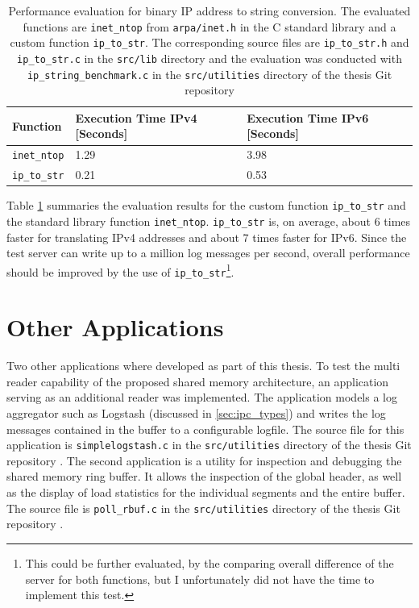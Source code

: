 \begin{table}[h!]
    \centering
    \small
    \begin{tabular}{lll}
        \toprule
        \textbf{Function} & \textbf{Execution Time IPv4 [Seconds]} & \textbf{Execution Time IPv6 [Seconds]} \\ \midrule 
        \texttt{inet\_ntop} & 1.29 & 3.98 \\ \midrule
        \texttt{ip\_to\_str} & 0.21 & 0.53 \\ 
        \bottomrule
    \end{tabular}
    \caption[IP String Conversion]{Performance evaluation for binary IP address to string conversion. The evaluated functions are
    \texttt{inet\_ntop} from \texttt{arpa/inet.h} in the C standard library and a custom function \texttt{ip\_to\_str}. The corresponding source 
    files are \texttt{ip\_to\_str.h}
    and \texttt{ip\_to\_str.c} in the \texttt{src/lib} directory and the evaluation was conducted with
    \texttt{ip\_string\_benchmark.c} in the \texttt{src/utilities} directory of the thesis Git repository \cite{gitlab}}
    \label{tab:ip_str}
\end{table}

Table \ref{tab:ip_str} summaries the evaluation results for the custom function \texttt{ip\_to\_str} and the standard library function \texttt{inet\_ntop}. 
\texttt{ip\_to\_str} is, on average, about 6 times faster for translating \ac{IPv4} addresses and about 7 times faster for \ac{IPv6}. Since the test server
can write up to a million log messages per second, overall performance should be improved by the use of \texttt{ip\_to\_str}\footnote{This could be further evaluated, by the comparing overall difference of the server for both functions, but I unfortunately did not have the time to implement this test.}. 

\section{Other Applications} \label{sec:other_app}

Two other applications where developed as part of this thesis. To test the multi reader capability of the proposed
shared memory architecture, an application serving as an additional reader was implemented. The application models a 
log aggregator such as Logstash (discussed in \ref{sec:ipc_types}) and writes the log messages contained in the buffer to a configurable 
logfile. The source file for this application is \texttt{simplelogstash.c} in the \texttt{src/utilities} directory of the thesis Git repository \cite{gitlab}.
The second application is a utility for inspection and debugging the shared memory ring buffer. It allows the inspection of the global header, as well
as the display of load statistics for the individual segments and the entire buffer. The source file is \texttt{poll\_rbuf.c} in the \texttt{src/utilities} directory of the thesis Git repository \cite{gitlab}. 

